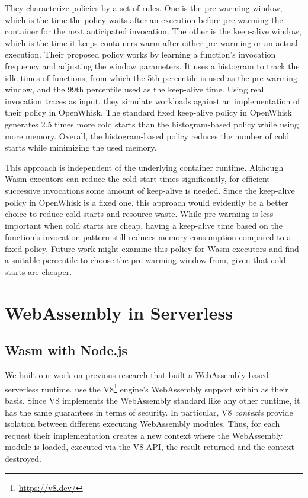 They characterize policies by a set of rules. One is the pre-warming window, which is the time the policy waits after an execution before pre-warming the container for the next anticipated invocation. The other is the keep-alive window, which is the time it keeps containers warm after either pre-warming or an actual execution.
Their proposed policy works by learning a function's invocation frequency and adjusting the window parameters. It uses a histogram to track the idle times of functions, from which the 5th percentile is used as the pre-warming window, and the 99th percentile used as the keep-alive time.
Using real invocation traces as input, they simulate workloads against an implementation of their policy in OpenWhisk. 
The standard fixed keep-alive policy in OpenWhisk generates 2.5 times more cold starts than the histogram-based policy while using more memory. Overall, the histogram-based policy reduces the number of cold starts while minimizing the used memory.

This approach is independent of the underlying container runtime. Although Wasm executors can reduce the cold start times significantly, for efficient successive invocations some amount of keep-alive is needed. Since the keep-alive policy in OpenWhisk is a fixed one, this approach would evidently be a better choice to reduce cold starts and resource waste. While pre-warming is less important when cold starts are cheap, having a keep-alive time based on the function's invocation pattern still reduces memory consumption compared to a fixed policy. Future work might examine this policy for Wasm executors and find a suitable percentile to choose the pre-warming window from, given that cold starts are cheaper.

\section{WebAssembly in Serverless}

\subsection{Wasm with Node.js}

We built our work on previous research that built a WebAssembly-based serverless runtime. \citeauthor{Hall2019} use the V8\footnote{\url{https://v8.dev/}} engine's WebAssembly support within  as their basis.
Since V8 implements the WebAssembly standard like any other runtime, it has the same guarantees in terms of security. In particular, V8 \emph{contexts} provide isolation between different executing WebAssembly modules. Thus, for each request their implementation creates a new context where the WebAssembly module is loaded, executed via the V8 API, the result returned and the context destroyed.


